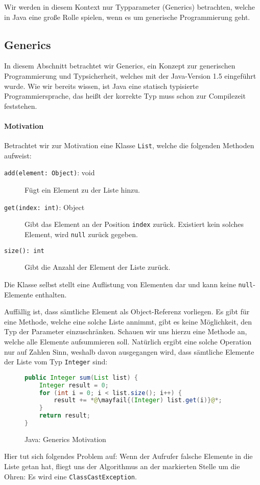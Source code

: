 
Wir werden in diesem Kontext nur Typparameter (Generics) betrachten, welche in Java eine große Rolle spielen, wenn es um generische Programmierung geht.

\subsection{Generics}
	\label{sec:generics}

	In diesem Abschnitt betrachtet wir Generics, ein Konzept zur generischen Programmierung und Typsicherheit, welches mit der Java-Version 1.5 eingeführt wurde. Wie wir bereits wissen, ist Java eine statisch typisierte Programmiersprache, das heißt der korrekte Typ muss schon zur Compilezeit feststehen.
	
	\paragraph{Motivation}
		Betrachtet wir zur Motivation eine Klasse \texttt{List}, welche die folgenden Methoden aufweist:
		\begin{description}
			\item[\texttt{add(element: Object)}: void] Fügt ein Element zu der Liste hinzu.
			\item[\texttt{get(index: int)}: Object] Gibt das Element an der Position \texttt{index} zurück. Existiert kein solches Element, wird \texttt{null} zurück gegeben.
			\item[\texttt{size(): int}] Gibt die Anzahl der Element der Liste zurück.
		\end{description}
		Die Klasse selbst stellt eine Auflistung von Elementen dar und kann keine \texttt{null}-Elemente enthalten.
		
		Auffällig ist, dass sämtliche Element als Object-Referenz vorliegen. Es gibt für eine Methode, welche eine solche Liste annimmt, gibt es keine Möglichkeit, den Typ der Parameter einzuschränken. Schauen wir uns hierzu eine Methode an, welche alle Elemente aufsummieren soll. Natürlich ergibt eine solche Operation nur auf Zahlen Sinn, weshalb davon ausgegangen wird, dass sämtliche Elemente der Liste vom Typ \texttt{Integer} sind:
		\begin{figure}[H]
			\centering
			\begin{lstlisting}[language = Java]
public Integer sum(List list) {
	Integer result = 0;
	for (int i = 0; i < list.size(); i++) {
		result += *@\mayfail{(Integer) list.get(i)}@*;
	}
	return result;
}
			\end{lstlisting}
			\caption{Java: Generics Motivation}
			\label{fig:generics_motivation}
		\end{figure}
		Hier tut sich folgendes Problem auf: Wenn der Aufrufer falsche Elemente in die Liste getan hat, fliegt uns der Algorithmus an der markierten Stelle um die Ohren: Es wird eine \texttt{ClassCastException}.
		
